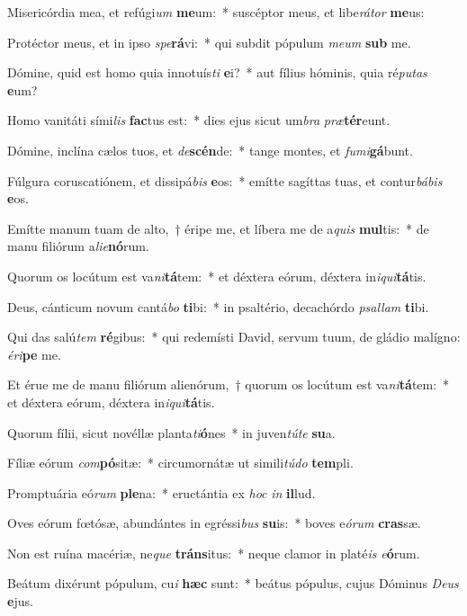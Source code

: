 \item Misericórdia mea, et refúgi\textit{um} \textbf{me}um:~* suscéptor meus, et libe\textit{rá}\textit{tor} \textbf{me}us:
\item Protéctor meus, et in ipso \textit{spe}\textbf{rá}vi:~* qui subdit pópulum \textit{me}\textit{um} \textbf{sub} me.
\item Dómine, quid est homo quia innotuís\textit{ti} \textbf{e}i?~* aut fílius hóminis, quia ré\textit{pu}\textit{tas} \textbf{e}um?
\item Homo vanitáti sími\textit{lis} \textbf{fac}tus est:~* dies ejus sicut um\textit{bra} \textit{præ}\textbf{tér}eunt.
\item Dómine, inclína cælos tuos, et \textit{de}\textbf{scén}de:~* tange montes, et \textit{fu}\textit{mi}\textbf{gá}bunt.
\item Fúlgura coruscatiónem, et dissipá\textit{bis} \textbf{e}os:~* emítte sagíttas tuas, et contur\textit{bá}\textit{bis} \textbf{e}os.
\item Emítte manum tuam de alto,~† éripe me, et líbera me de a\textit{quis} \textbf{mul}tis:~* de manu filiórum a\textit{li}\textit{e}\textbf{nó}rum.
\item Quorum os locútum est va\textit{ni}\textbf{tá}tem:~* et déxtera eórum, déxtera in\textit{i}\textit{qui}\textbf{tá}tis.
\item Deus, cánticum novum cantá\textit{bo} \textbf{ti}bi:~* in psaltério, decachórdo \textit{psal}\textit{lam} \textbf{ti}bi.
\item Qui das salú\textit{tem} \textbf{ré}gibus:~* qui redemísti David, servum tuum, de gládio malígno: \textit{é}\textit{ri}\textbf{pe} me.
\item Et érue me de manu filiórum alienórum,~† quorum os locútum est va\textit{ni}\textbf{tá}tem:~* et déxtera eórum, déxtera in\textit{i}\textit{qui}\textbf{tá}tis.
\item Quorum fílii, sicut novéllæ planta\textit{ti}\textbf{ó}nes~* in juven\textit{tú}\textit{te} \textbf{su}a.
\item Fíliæ eórum \textit{com}\textbf{pó}sitæ:~* circumornátæ ut simili\textit{tú}\textit{do} \textbf{tem}pli.
\item Promptuária eó\textit{rum} \textbf{ple}na:~* eructántia ex \textit{hoc} \textit{in} \textbf{il}lud.
\item Oves eórum fœtósæ, abundántes in egréssi\textit{bus} \textbf{su}is:~* boves e\textit{ó}\textit{rum} \textbf{cras}sæ.
\item Non est ruína macériæ, ne\textit{que} \textbf{tráns}itus:~* neque clamor in platé\textit{is} \textit{e}\textbf{ó}rum.
\item Beátum dixérunt pópulum, cu\textit{i} \textbf{hæc} sunt:~* beátus pópulus, cujus Dóminus \textit{De}\textit{us} \textbf{e}jus.
